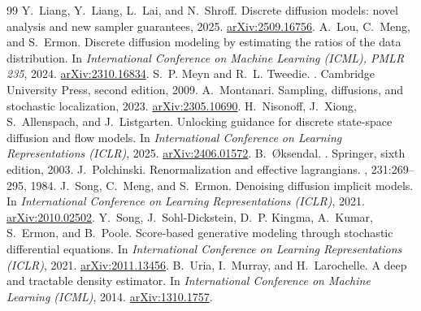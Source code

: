 \documentclass[10pt,a4paper]{amsart}
\numberwithin{equation}{section}
\begin{document}
\begin{thebibliography}{99}
 Y.~Liang, Y.~Liang, L.~Lai, and N.~Shroff. \newblock Discrete diffusion models: novel analysis and new sampler guarantees, 2025. \newblock \href{https://arxiv.org/abs/2509.16756}{arXiv:2509.16756}.
 A.~Lou, C.~Meng, and S.~Ermon. \newblock Discrete diffusion modeling by estimating the ratios of the data distribution. \newblock In {\em International Conference on Machine Learning (ICML), PMLR 235}, 2024. \newblock \href{https://arxiv.org/abs/2310.16834}{arXiv:2310.16834}.
 S.~P. Meyn and R.~L. Tweedie. . \newblock Cambridge University Press, second edition, 2009.
 A.~Montanari. \newblock Sampling, diffusions, and stochastic localization, 2023. \newblock \href{https://arxiv.org/abs/2305.10690}{arXiv:2305.10690}.
 H.~Nisonoff, J.~Xiong, S.~Allenspach, and J.~Listgarten. \newblock Unlocking guidance for discrete state-space diffusion and flow models. \newblock In {\em International Conference on Learning Representations (ICLR)}, 2025. \newblock \href{https://arxiv.org/abs/2406.01572}{arXiv:2406.01572}.
 B.~{\O}ksendal. . \newblock Springer, sixth edition, 2003.
 J.~Polchinski. \newblock Renormalization and effective lagrangians. , 231:269--295, 1984.
 J.~Song, C.~Meng, and S.~Ermon. \newblock Denoising diffusion implicit models. \newblock In {\em International Conference on Learning Representations (ICLR)}, 2021. \newblock \href{https://arxiv.org/abs/2010.02502}{arXiv:2010.02502}.
 Y.~Song, J.~Sohl-Dickstein, D.~P. Kingma, A.~Kumar, S.~Ermon, and B.~Poole. \newblock Score-based generative modeling through stochastic differential equations. \newblock In {\em International Conference on Learning Representations (ICLR)}, 2021. \newblock \href{https://arxiv.org/abs/2011.13456}{arXiv:2011.13456}.
 B.~Uria, I.~Murray, and H.~Larochelle. \newblock A deep and tractable density estimator. \newblock In {\em International Conference on Machine Learning (ICML)}, 2014. \newblock \href{https://arxiv.org/abs/1310.1757}{arXiv:1310.1757}.

\end{thebibliography}
\end{document}

